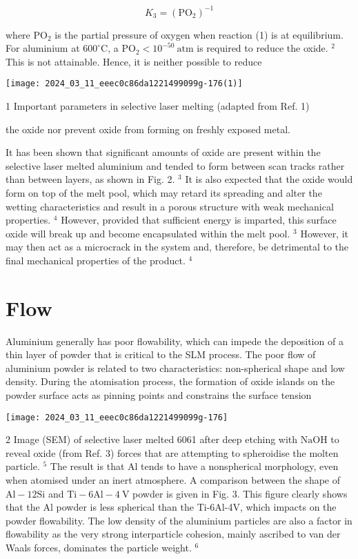 \documentclass[10pt]{article}
\begin{document}
\begin{equation*}
K_{3}=\left(\mathrm{PO}_{2}\right)^{-1} \tag{3}
\end{equation*}


where $\mathrm{PO}_{2}$ is the partial pressure of oxygen when reaction (1) is at equilibrium. For aluminium at $600^{\circ} \mathrm{C}$, a $\mathrm{PO}_{2}<10^{-50} \mathrm{~atm}$ is required to reduce the oxide. ${ }^{2}$ This is not attainable. Hence, it is neither possible to reduce

\begin{center}
\texttt{[image: 2024\_03\_11\_eeec0c86da1221499099g-176(1)]}
\end{center}

1 Important parameters in selective laser melting (adapted from Ref. 1)

the oxide nor prevent oxide from forming on freshly exposed metal.

It has been shown that significant amounts of oxide are present within the selective laser melted aluminium and tended to form between scan tracks rather than between layers, as shown in Fig. 2. ${ }^{3}$ It is also expected that the oxide would form on top of the melt pool, which may retard its spreading and alter the wetting characteristics and result in a porous structure with weak mechanical properties. ${ }^{4}$ However, provided that sufficient energy is imparted, this surface oxide will break up and become encapsulated within the melt pool. ${ }^{3}$ However, it may then act as a microcrack in the system and, therefore, be detrimental to the final mechanical properties of the product. ${ }^{4}$

\section*{Flow}
Aluminium generally has poor flowability, which can impede the deposition of a thin layer of powder that is critical to the SLM process. The poor flow of aluminium powder is related to two characteristics: non-spherical shape and low density. During the atomisation process, the formation of oxide islands on the powder surface acts as pinning points and constrains the surface tension

\begin{center}
\texttt{[image: 2024\_03\_11\_eeec0c86da1221499099g-176]}
\end{center}

2 Image (SEM) of selective laser melted 6061 after deep etching with $\mathrm{NaOH}$ to reveal oxide (from Ref. 3) forces that are attempting to spheroidise the molten particle. ${ }^{5}$ The result is that $\mathrm{Al}$ tends to have a nonspherical morphology, even when atomised under an inert atmosphere. A comparison between the shape of $\mathrm{Al}-12 \mathrm{Si}$ and $\mathrm{Ti}-6 \mathrm{Al}-4 \mathrm{~V}$ powder is given in Fig. 3. This figure clearly shows that the $\mathrm{Al}$ powder is less spherical than the Ti-6Al-4V, which impacts on the powder flowability. The low density of the aluminium particles are also a factor in flowability as the very strong interparticle cohesion, mainly ascribed to van der Waals forces, dominates the particle weight. ${ }^{6}$
\end{document}
